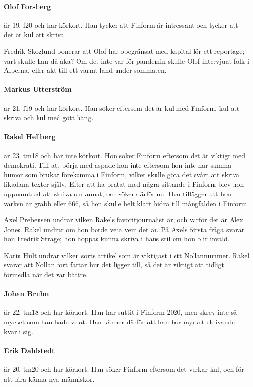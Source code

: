 \documentclass[hidelinks]{sektionsmote}
\begin{document}
\paragraph{Olof Forsberg} är 19, f20 och har körkort.
Han tycker att Finform är intressant och tycker att det är kul att skriva.

Fredrik Skoglund ponerar att Olof har obegränsat med kapital för ett reportage; vart skulle han då åka?
Om det inte var för pandemin skulle Olof intervjuat folk i Alperna, eller åkt till ett varmt land under sommaren.

\paragraph{Markus Utterström} är 21, f19 och har körkort.
Han söker eftersom det är kul med Finform, kul att skriva och kul med gött häng.

\paragraph{Rakel Hellberg} är 23, tm18 och har inte körkort.
Hon söker Finform eftersom det är viktigt med demokrati.
Till att börja med aspade hon inte eftersom hon inte har samma humor som brukar förekomma i Finform, vilket skulle göra det svårt att skriva likadana texter själv.
Efter att ha pratat med några sittande i Finform blev hon uppmuntrad att skriva om annat, och söker därför nu.
Hon tillägger att hon varken är grabb eller 666, så hon skulle helt klart bidra till mångfalden i Finform.

Axel Prebensen undrar vilken Rakels favoritjournalist är, och varför det är Alex Jones.
Rakel undrar om hon borde veta vem det är.
På Axels första fråga svarar hon Fredrik Strage; hon hoppas kunna skriva i hans stil om hon blir invald.

Karin Hult undrar vilken sorts artikel som är viktigast i ett Nollannummer.
Rakel svarar att Nollan fort fattar hur det ligger till, så det är viktigt att tidligt förmedla när det var bättre.

\paragraph{Johan Bruhn} är 22, tm18 och har körkort.
Han har suttit i Finform 2020, men skrev inte så mycket som han hade velat.
Han känner därför att han har mycket skrivande kvar i sig.

\paragraph{Erik Dahlstedt} är 20, tm20 och har körkort.
Han söker Finform eftersom det verkar kul, och för att lära känna nya människor.
\end{document}
